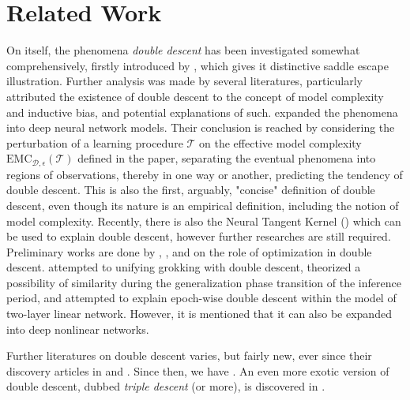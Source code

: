 \documentclass[10pt]{article} %
\begin{document}
\section{Related Work}

On itself, the phenomena \textit{double descent} has been investigated somewhat comprehensively, firstly introduced by \cite{belkin_reconciling_2019}, which gives it distinctive saddle escape illustration. Further analysis was made by several literatures, particularly attributed the existence of double descent to the concept of model complexity and inductive bias, and potential explanations of such. \cite{nakkiran_deep_2019} expanded the phenomena into deep neural network models. Their conclusion is reached by considering the perturbation of a learning procedure $\mathcal{T}$ on the effective model complexity $\mathrm{EMC}_{\mathcal{D},\epsilon}(\mathcal{T})$ defined in the paper, separating the eventual phenomena into regions of observations, thereby in one way or another, predicting the tendency of double descent. This is also the first, arguably, "concise" definition of double descent, even though its nature is an empirical definition, including the notion of model complexity. Recently, there is also the Neural Tangent Kernel (\cite{Jacot:2018:NTK}) which can be used to explain double descent, however further researches are still required. Preliminary works are done by \cite{lafon_understanding_2024}, \cite{schaeffer_double_2023}, and \cite{liu2023understandingroleoptimizationdouble} on the role of optimization in double descent. \cite{davies_unifying_2023} attempted to unifying grokking with double descent, theorized a possibility of similarity during the generalization phase transition of the inference period, and \cite{olmin2024understandingepochwisedoubledescent} attempted to explain epoch-wise double descent within the model of two-layer linear network. However, it is mentioned that it can also be expanded into deep nonlinear networks. 

Further literatures on double descent varies, but fairly new, ever since their discovery articles in \cite{belkin_reconciling_2019} and \cite{nakkiran_deep_2019}. Since then, we have \cite{shi2024homophilymodulatesdoubledescent,schaeffer_double_2023,quetu_can_2023,lafon_understanding_2024,neal2019biasvariancetradeofftextbooksneed,davies_unifying_2023,quetu_can_2023-1,liu2023understandingroleoptimizationdouble,mei2020generalizationerrorrandomfeatures,mei2019generalization,adlam2020understandingdoubledescentrequires,transtrum2025egaddoubledescentexplained,liu2021kernelregressionhighdimensions,allerbo2025changingkerneltrainingleads,pezeshki2021multiscalefeaturelearningdynamics,brellmann2024on,nakkiran2019moredata,mei2019randomfeatures,heckel2020early,nakkiran2020regularization,Belkin_2020,Yang_2024,spiess2023doublesingledescentcausal,nakkiran2021optimalregularizationmitigatedouble,zhang2024manipulatingsparsedoubledescent,cherkassky2024understand,nakkiran2019datahurtlinearregression}. An even more exotic version of double descent, dubbed \textit{triple descent} (or more), is discovered in \cite{d_ascoli_triple_2020}. 
\end{document}
